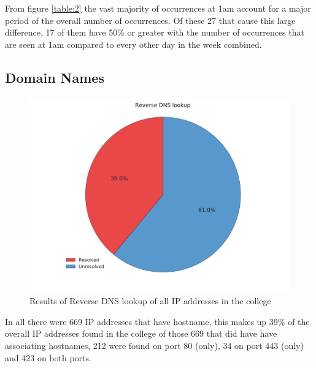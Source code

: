 \documentclass[a4wide,leqno,12pt]{report}
\begin{document}
From figure \ref{table:2} the vast majority of occurrences at 1am account for a major period of the overall number of occurrences. Of these 27 that cause this large difference, 17 of them have 50\% or greater with the number of occurrences that are seen at 1am compared to every other day in the week combined.
 
\subsection{Domain Names}
\begin{figure}[H]
\centering
\includegraphics[scale=.5]{pdf_images/ReverseDNSlookup}
\caption{Results of Reverse DNS lookup of all IP addresses in the college}
\end{figure}

In all there were 669 IP addresses that have hostname, this makes up 39\% of the overall IP addresses found in the college of those 669 that did have have associating hostnames, 212 were found on port 80 (only), 34 on port 443 (only) and 423 on both ports.
\end{document}

